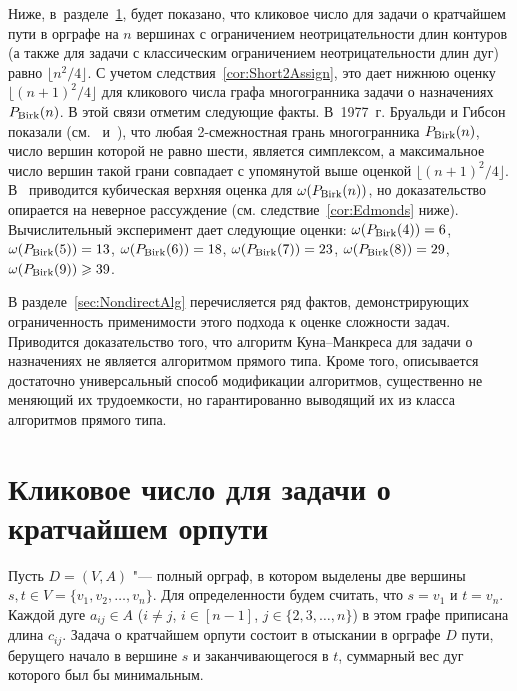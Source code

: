 Ниже, в~разделе~\ref{sec:ShortPathClique}, будет показано, что кликовое число для задачи о кратчайшем пути в орграфе на $n$ вершинах с ограничением неотрицательности длин контуров (а также для задачи с классическим ограничением неотрицательности длин дуг) равно $\lfloor n^2 / 4\rfloor$.
С учетом следствия~\ref{cor:Short2Assign}, это дает нижнюю оценку $\lfloor (n+1)^2 / 4\rfloor$ для кликового числа графа многогранника задачи о назначениях $P_{\textup{Birk}}(n)$.
В этой связи отметим следующие факты.
В~1977~г. Бруальди и Гибсон показали (см.~\cite[Theorem~6.1, Corollary~6.5]{Brualdi:1977II} и~\cite[Corollary~3.7]{Brualdi:1977I}), что любая 2-смежностная грань многогранника $P_{\textup{Birk}}(n)$, число вершин которой не равно шести, является симплексом, а максимальное число вершин такой грани совпадает с упомянутой выше оценкой $\lfloor (n+1)^2 / 4\rfloor$.
В~\cite{BondBook:1995} приводится кубическая верхняя оценка для $\omega(P_{\textup{Birk}}(n))$, но доказательство опирается на неверное рассуждение (см. следствие~\ref{cor:Edmonds} ниже).
Вычислительный эксперимент дает следующие оценки:
$\omega(P_{\textup{Birk}}(4)) = 6$, $\omega(P_{\textup{Birk}}(5)) = 13$, $\omega(P_{\textup{Birk}}(6)) = 18$, $\omega(P_{\textup{Birk}}(7)) = 23$, $\omega(P_{\textup{Birk}}(8)) = 29$, $\omega(P_{\textup{Birk}}(9)) \geqslant 39$.

В разделе~\ref{sec:NondirectAlg} перечисляется ряд фактов, демонстрирующих ограниченность применимости этого подхода к оценке сложности задач.
Приводится доказательство того, что алгоритм Куна--Манкреса для задачи о назначениях не является алгоритмом прямого типа.
Кроме того, описывается достаточно универсальный способ модификации алгоритмов,
существенно не меняющий их трудоемкости, но гарантированно выводящий их из класса алгоритмов прямого типа.


%
%

\section{Кликовое число для задачи о кратчайшем орпути}
\label{sec:ShortPathClique}

Пусть $D = (V,A)$ "--- полный орграф, в котором выделены две вершины $s,t\in V=\{v_1,v_2,\ldots,v_n\}$. Для определенности будем считать, что $s=v_1$ и $t=v_n$. Каждой дуге $a_{ij}\in A$ ($i\ne j$, $i\in[n-1]$, $j\in\{2,3,\ldots,n\}$) в этом графе приписана длина $c_{ij}$. 
Задача о кратчайшем орпути состоит в отыскании в орграфе $D$ пути, берущего начало в вершине $s$ и заканчивающегося в $t$, суммарный вес дуг которого был бы минимальным.

